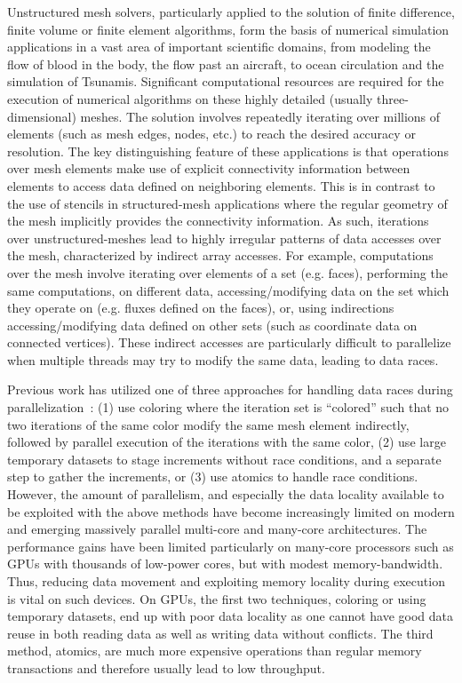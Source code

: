 
\noindent Unstructured mesh solvers, particularly applied to the solution of 
finite difference, finite volume or finite element algorithms, form the basis 
of numerical simulation applications in a vast area of important scientific 
domains, from modeling the flow of blood in the body, the flow past an aircraft, 
to ocean circulation and the simulation of Tsunamis. Significant computational 
resources are required for the execution of numerical algorithms on these highly 
detailed (usually three-dimensional) meshes. The solution involves repeatedly 
iterating over millions of elements (such as mesh edges, nodes, etc.) to reach 
the desired accuracy or resolution. The key distinguishing feature of these 
applications is that operations over mesh elements make use of explicit 
connectivity information between elements to access data defined on neighboring 
elements. This is in contrast to the use of stencils in structured-mesh 
applications where the regular geometry of the mesh implicitly provides the 
connectivity information. As such, iterations over unstructured-meshes lead to 
highly irregular patterns of data accesses over the mesh, characterized by 
indirect array accesses. For example, computations over the mesh involve 
iterating over elements of a set (e.g. faces), performing the same computations, 
on different data, accessing/modifying data on the set which they operate on 
(e.g. fluxes defined on the faces), or, using indirections accessing/modifying 
data defined on other sets (such as coordinate data on connected vertices). 
These indirect accesses are particularly difficult to parallelize when multiple 
threads may try to modify the same data, leading to data races. 

Previous work has utilized one of three approaches for handling data races 
during parallelization~\cite{LULESH:spec,miniaero}: (1) use coloring where the 
iteration set is ``colored'' such that no two iterations of the same color 
modify the same mesh element indirectly, followed by parallel execution of the 
iterations with the same color, (2) use large temporary datasets to stage 
increments without race conditions, and a separate step to gather the 
increments, or (3) use atomics to handle race conditions. However, the amount 
of parallelism, and especially the data locality available to be exploited with 
the above methods have become increasingly limited on modern and emerging 
massively parallel multi-core and many-core architectures. The performance gains 
have been limited particularly on many-core processors such as GPUs with 
thousands of low-power cores, but with modest memory-bandwidth. Thus, reducing 
data movement and exploiting memory locality during execution is vital on such 
devices. On GPUs, the first two techniques, coloring or using temporary 
datasets, end up with poor data locality as one cannot have good data reuse in 
both reading data as well as writing data without conflicts. The third method, 
atomics, are much more expensive operations than regular memory transactions and 
therefore usually lead to low throughput. 

